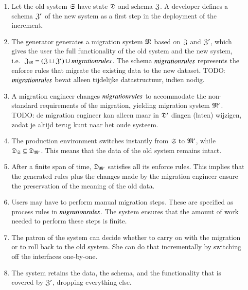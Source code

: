 \documentclass{elsarticle}
\begin{document}
\begin{enumerate}
   \item Let the old system $\mathfrak{S}$ have state $\mathfrak{D}$ and schema $\mathfrak{Z}$.
         A developer defines a schema $\mathfrak{Z}'$ of the new system as a first step in the deployment of the increment.
   \item The generator generates a migration system $\mathfrak{M}$ based on $\mathfrak{Z}$ and $\mathfrak{Z}'$,
         which gives the user the full functionality of the old system and the new system,
         i.e.\ $\mathfrak{Z}_{\mathfrak{M}}=(\mathfrak{Z}\sqcup\mathfrak{Z}')\cup\text{\it migrationrules\/}$.
         The schema $\text{\it migrationrules\/}$ represents the enforce rules that migrate the existing data to the new dataset.
         TODO: $\text{\it migrationrules\/}$ bevat alleen tijdelijke datastructuur, indien nodig.
   \item A migration engineer changes $\text{\it migrationrules\/}$ to accommodate the non-standard requirements of the migration,
         yielding migration system $\mathfrak{M}'$.
         TODO: de migration engineer kan alleen maar in $\mathfrak{D}'$ dingen (laten) wijzigen, zodat je altijd terug kunt naar het oude systeem.
   \item The production environment switches instantly from $\mathfrak{S}$ to $\mathfrak{M}'$,
         while $\mathfrak{D}_{\mathfrak{S}}\subseteq\mathfrak{D}_{\mathfrak{M}'}$.
         This means that the data of the old system remains intact.
   \item After a finite span of time, $\mathfrak{D}_{\mathfrak{M}'}$ satisfies all its enforce rules.
         This implies that the generated rules plus the changes made by the migration engineer ensure the preservation of the meaning of the old data.
   \item Users may have to perform manual migration steps.
         These are specified as process rules in $\text{\it migrationrules\/}$.
         The system ensures that the amount of work needed to perform these steps is finite.
   \item The patron of the system can decide whether to carry on with the migration or to roll back to the old system.
         She can do that incrementally by switching off the interfaces one-by-one.
   \item The system retains the data, the schema, and the functionality that is covered by $\mathfrak{Z}'$, dropping everything else.
\end{enumerate}
\end{document}
